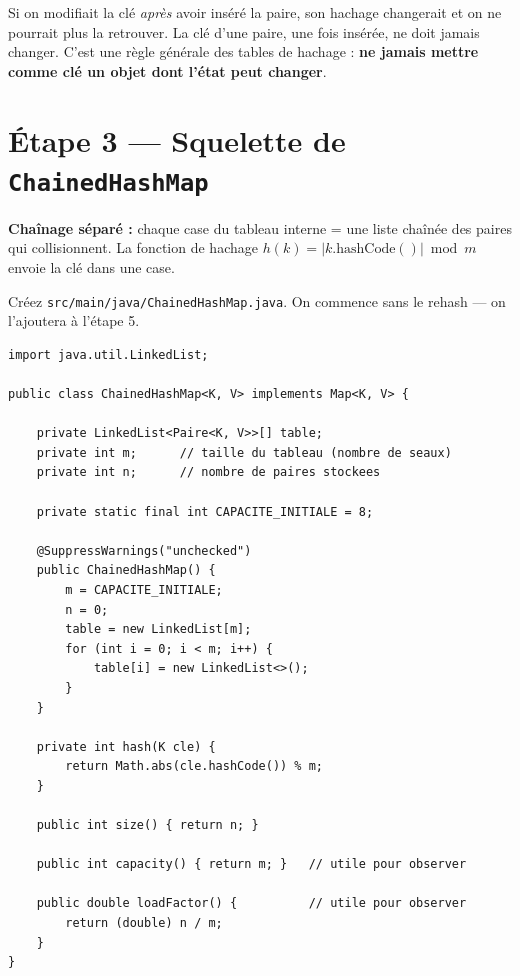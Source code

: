 \documentclass[11pt,a4paper]{article}
\begin{document}
\begin{attentionbox}
Si on modifiait la clé \emph{après} avoir inséré la paire, son hachage changerait et on ne pourrait plus la retrouver. La clé d'une paire, une fois insérée, ne doit jamais changer. C'est une règle générale des tables de hachage : \textbf{ne jamais mettre comme clé un objet dont l'état peut changer}.
\end{attentionbox}

\section{Étape 3 --- Squelette de \texttt{ChainedHashMap}}

\begin{lienbox}[Ce qu'on matérialise du CM]
\textbf{Chaînage séparé :} chaque case du tableau interne = une liste chaînée des paires qui collisionnent. La fonction de hachage $h(k) = |k.\text{hashCode}()| \bmod m$ envoie la clé dans une case.
\end{lienbox}

Créez \texttt{src/main/java/ChainedHashMap.java}. On commence sans le rehash --- on l'ajoutera à l'étape 5.

\begin{lstlisting}[style=java]
import java.util.LinkedList;

public class ChainedHashMap<K, V> implements Map<K, V> {

    private LinkedList<Paire<K, V>>[] table;
    private int m;      // taille du tableau (nombre de seaux)
    private int n;      // nombre de paires stockees

    private static final int CAPACITE_INITIALE = 8;

    @SuppressWarnings("unchecked")
    public ChainedHashMap() {
        m = CAPACITE_INITIALE;
        n = 0;
        table = new LinkedList[m];
        for (int i = 0; i < m; i++) {
            table[i] = new LinkedList<>();
        }
    }

    private int hash(K cle) {
        return Math.abs(cle.hashCode()) % m;
    }

    public int size() { return n; }

    public int capacity() { return m; }   // utile pour observer

    public double loadFactor() {          // utile pour observer
        return (double) n / m;
    }
}
\end{lstlisting}
\end{document}
